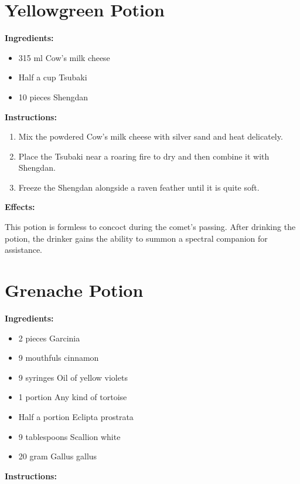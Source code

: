 \documentclass{article}
\begin{document}
\newpage
\section*{Yellowgreen Potion}

\textbf{Ingredients:}

\begin{itemize}
  \item 315 ml Cow's milk cheese
  \item Half a cup Tsubaki
  \item 10 pieces Shengdan
\end{itemize}

\textbf{Instructions:}

\begin{enumerate}
  \item Mix the powdered Cow's milk cheese with silver sand and heat delicately.
  \item Place the Tsubaki near a roaring fire to dry and then combine it with Shengdan.
  \item Freeze the Shengdan alongside a raven feather until it is quite soft.
\end{enumerate}

\textbf{Effects:}

This potion is formless to concoct during the comet’s passing. After drinking the potion, the drinker gains the ability to summon a spectral companion for assistance.

\newpage
\section*{Grenache Potion}

\textbf{Ingredients:}

\begin{itemize}
  \item 2 pieces Garcinia
  \item 9 mouthfuls cinnamon
  \item 9 syringes Oil of yellow violets
  \item 1 portion Any kind of tortoise
  \item Half a portion Eclipta prostrata
  \item 9 tablespoons Scallion white
  \item 20 gram Gallus gallus
\end{itemize}

\textbf{Instructions:}
\end{document}
